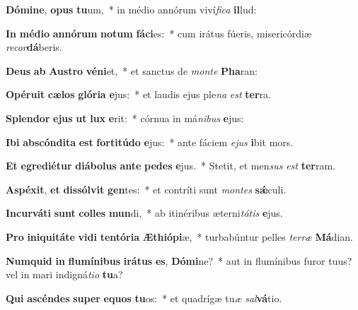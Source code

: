\item \textbf{Dó}\textbf{mi}\textbf{ne}, \textbf{o}\textbf{pus} \textbf{tu}um,~* in médio annórum viví\textit{fi}\textit{ca} \textbf{il}lud:
\item \textbf{In} \textbf{mé}\textbf{di}\textbf{o} \textbf{an}\textbf{nó}\textbf{rum} \textbf{no}\textbf{tum} \textbf{fá}\textbf{ci}es:~* cum irátus fúeris, misericórdiæ \textit{re}\textit{cor}\textbf{dá}beris.
\item \textbf{De}\textbf{us} \textbf{ab} \textbf{Aus}\textbf{tro} \textbf{vé}\textbf{ni}et,~* et sanctus de \textit{mon}\textit{te} \textbf{Pha}ran:
\item \textbf{O}\textbf{pé}\textbf{ru}\textbf{it} \textbf{cæ}\textbf{los} \textbf{gló}\textbf{ri}\textbf{a} \textbf{e}jus:~* et laudis ejus ple\textit{na} \textit{est} \textbf{ter}ra.
\item \textbf{Splen}\textbf{dor} \textbf{e}\textbf{jus} \textbf{ut} \textbf{lux} \textbf{e}rit:~* córnua in má\textit{ni}\textit{bus} \textbf{e}jus:
\item \textbf{I}\textbf{bi} \textbf{abs}\textbf{cón}\textbf{di}\textbf{ta} \textbf{est} \textbf{for}\textbf{ti}\textbf{tú}\textbf{do} \textbf{e}jus:~* ante fáciem \textit{e}\textit{jus} \textbf{i}bit mors.
\item \textbf{Et} \textbf{e}\textbf{gre}\textbf{di}\textbf{é}\textbf{tur} \textbf{di}\textbf{á}\textbf{bo}\textbf{lus} \textbf{an}\textbf{te} \textbf{pe}\textbf{des} \textbf{e}jus.~* Stetit, et men\textit{sus} \textit{est} \textbf{ter}ram.
\item \textbf{A}\textbf{spé}\textbf{xit}, \textbf{et} \textbf{dis}\textbf{sól}\textbf{vit} \textbf{gen}tes:~* et contríti sunt \textit{mon}\textit{tes} \textbf{sǽ}culi.
\item \textbf{In}\textbf{cur}\textbf{vá}\textbf{ti} \textbf{sunt} \textbf{col}\textbf{les} \textbf{mun}di,~* ab itinéribus æterni\textit{tá}\textit{tis} \textbf{e}jus.
\item \textbf{Pro} \textbf{in}\textbf{i}\textbf{qui}\textbf{tá}\textbf{te} \textbf{vi}\textbf{di} \textbf{ten}\textbf{tó}\textbf{ri}\textbf{a} \textbf{Æ}\textbf{thi}\textbf{ó}\textbf{pi}æ,~* turbabúntur pelles \textit{ter}\textit{ræ} \textbf{Má}dian.
\item \textbf{Num}\textbf{quid} \textbf{in} \textbf{flu}\textbf{mí}\textbf{ni}\textbf{bus} \textbf{i}\textbf{rá}\textbf{tus} \textbf{es}, \textbf{Dó}\textbf{mi}ne?~* aut in flumínibus furor tuus? vel in mari indigná\textit{ti}\textit{o} \textbf{tu}a?
\item \textbf{Qui} \textbf{a}\textbf{scén}\textbf{des} \textbf{su}\textbf{per} \textbf{e}\textbf{quos} \textbf{tu}os:~* et quadrígæ tu\textit{æ} \textit{sal}\textbf{vá}tio.

